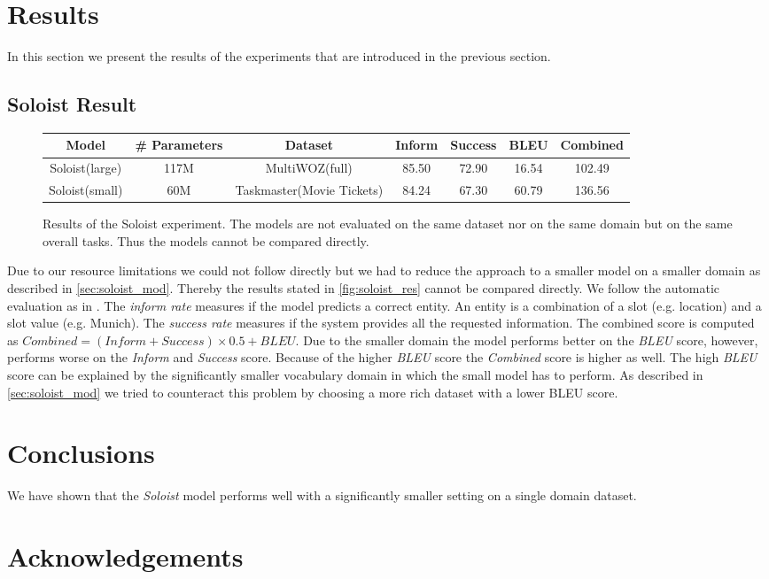 \documentclass[twocolumn]{tum-article}
\begin{document}
\section{Results}
In this section we present the results of the experiments that are introduced in the previous section.  
\subsection{Soloist Result}
\begin{figure}[!h]
\centering
\begin{tabular}{c|c|c|c|c|c|c}
\hline
\textbf{Model} & \textbf{\# Parameters} & \textbf{Dataset} & \textbf{Inform} & \textbf{Success} & \textbf{BLEU} & \textbf{Combined}\\
\hline
Soloist(large) & 117M & MultiWOZ(full) & 85.50 & 72.90 & 16.54 & 102.49 \\
\hline
Soloist(small) & 60M & Taskmaster(Movie Tickets) & 84.24 & 67.30 & 60.79 & 136.56\\
\hline
\end{tabular}
\caption{Results of the Soloist experiment. The models are not evaluated on the same dataset nor on the same domain but on the same overall tasks. Thus the models cannot be compared directly. }
\label{fig:soloist_res}
\end{figure}
Due to our resource limitations we could not follow \cite{peng2020soloist} directly but we had to reduce the approach to a smaller model on a smaller domain as described in \autoref{sec:soloist_mod}. Thereby the results stated in \autoref{fig:soloist_res} cannot be compared directly. 
We follow the automatic evaluation as in \cite{peng2020soloist, budzianowski2020multiwoz}. The \textit{inform rate} measures if the model predicts a correct entity. An entity is a combination of a slot (e.g. location) and a slot value (e.g. Munich). The \textit{success rate} measures if the system provides all the requested information. The combined score is computed as $Combined = (Inform + Success) \times 0.5 + BLEU$.
Due to the smaller domain the model performs better on the \textit{BLEU} score, however, performs worse on the \textit{Inform} and \textit{Success} score. Because of the higher \textit{BLEU} score the \textit{Combined} score is higher as well. 
The high \textit{BLEU} score can be explained by the significantly smaller vocabulary domain in which the small model has to perform. As described in \autoref{sec:soloist_mod} we tried to counteract this problem by choosing a more rich dataset with a lower BLEU score.  
\section{Conclusions}
We have shown that the \textit{Soloist} model performs well with a significantly smaller setting on a single domain dataset.   
\section*{Acknowledgements}


\end{document}

